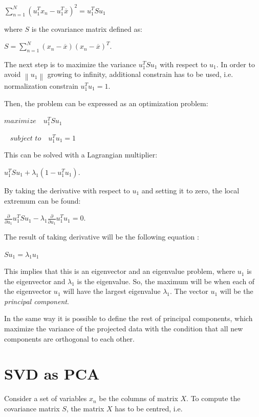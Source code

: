 {\centering$\sum_{n=1}^{N}(u_{1}^Tx_{n}-u_{1}^T\overline{x} )^2=u_{1}^TSu_{1}$\\}

where $S$ is the covariance matrix defined as:

{\centering$S=\sum_{n=1}^{N}(x_{n}-\overline{x})(x_{n}-\overline{x})^T.$\\}

The next step is to maximize the variance $u_{1}^TSu_{1}$ with respect to $u_{1}$. In order to avoid $\left \| u_{1} \right \|$ growing to infinity, additional constrain has to be used,
i.e.  normalization constrain $u_{1}^Tu_{1}=1$.

Then, the problem can be expressed as an optimization problem:

{\centering$maximize\,\,\,\,\,\,u_{1}^TSu_{1}$\\}

{\centering$\,\,\,\,\,subject \,\,to \,\,\,\,\,\,u_{1}^Tu_{1}=1$\\}

This can be solved with a Lagrangian multiplier:

{\centering$u_{1}^TSu_{1}+\lambda_{1}(1-u_{1}^Tu_{1}).$\\}

By taking the derivative with respect to $u_{1}$ and setting it to zero, the local extremum can be found:

{\centering$\frac{\partial }{\partial u_{1}}u_{1}^TSu_{1}-\lambda_{1}\frac{\partial }{\partial u_{1}}u_{1}^Tu_{1}=0.$\\}

The result of taking derivative will be the following equation \cite{Bishop}:

{\centering$Su_{1}=\lambda_{1}u_{1}$\\}

This implies that this is an eigenvector and an eigenvalue problem, where $u_{1}$ is the eigenvector and $\lambda_{1}$ is the eigenvalue.
So, the maximum will be when each of the eigenvector $u_{1}$ will have the largest eigenvalue $\lambda_{1}$. 
The vector $u_{1}$ will be the \emph{principal component}.

In the same way it is possible to define the rest of principal components, 
which maximize the variance of the projected data with the condition that all new components are orthogonal to each other.


 \section{SVD as PCA}
\label{section:svd}
Consider a set of variables $x_{n}$ be the columns of matrix $X$. To compute the covariance matrix $S$, the matrix $X$ has to be centred, i.e. 

